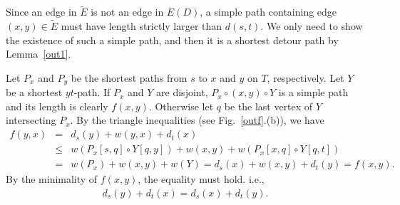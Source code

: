 \documentclass[review]{elsarticle}
\begin{document}
\begin{pf}
Since an edge in $\widetilde{E}$ is not an edge in $E(D)$, a simple
path containing edge $(x,y)\in \widetilde{E}$ must have length
strictly larger than $d(s,t)$. We only need to show the existence of
such a simple path, and then it is a shortest detour path by
Lemma~\ref{out1}.

Let $P_x$ and $P_y$ be the shortest paths from $s$ to $x$ and $y$ on
$T$, respectively. Let $Y$ be a shortest $yt$-path. If $P_x$ and $Y$
are disjoint, $P_x\circ (x,y)\circ Y$ is a simple path and its
length is clearly $f(x,y)$. Otherwise let $q$ be the last vertex of
$Y$ intersecting $P_x$. By the triangle inequalities (see
Fig.~\ref{outf}.(b)), we have
\begin{eqnarray*}
f(y,x)&=&d_s(y)+w(y,x)+d_t(x)\\
&\leqslant&w(P_x[s,q]\circ Y[q,y])+w(x,y)+w(P_x[x,q]\circ Y[q,t])\\
&=&w(P_x)+w(x,y)+w(Y)=d_s(x)+w(x,y)+d_t(y)=f(x,y).
\end{eqnarray*}
By the minimality of $f(x,y)$, the equality must hold. i.e.,
\begin{eqnarray}\label{outeq1}
d_s(y)+d_t(x)=d_s(x)+d_t(y).
\end{eqnarray}


\end{pf}
\end{document}
